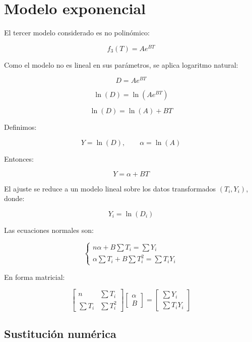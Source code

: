 \documentclass[12pt,a4paper]{article}
\newcommand{\modeloExponencial}{f_3(T)=Ae^{BT}}
\begin{document}
\section{Modelo exponencial}

El tercer modelo considerado es no polinómico:

\[
    \modeloExponencial
\]

Como el modelo no es lineal en sus parámetros, se aplica logaritmo natural:

\[
    D = Ae^{BT}
\]

\[
    \ln(D)=\ln(Ae^{BT})
\]

\[
    \ln(D)=\ln(A)+BT
\]

Definimos:

\[
    Y = \ln(D),
    \qquad
    \alpha = \ln(A)
\]

Entonces:

\[
    Y = \alpha + BT
\]

El ajuste se reduce a un modelo lineal sobre los datos transformados \((T_i,Y_i)\), donde:

\[
    Y_i = \ln(D_i)
\]

Las ecuaciones normales son:

\[
\begin{cases}
n\alpha + B\sum T_i = \sum Y_i \\
\alpha\sum T_i + B\sum T_i^2 = \sum T_iY_i
\end{cases}
\]

En forma matricial:

\[
\begin{bmatrix}
n & \sum T_i \\
\sum T_i & \sum T_i^2
\end{bmatrix}
\begin{bmatrix}
\alpha \\
B
\end{bmatrix}
=
\begin{bmatrix}
\sum Y_i \\
\sum T_iY_i
\end{bmatrix}
\]

\subsection{Sustitución numérica}

\begin{table}[H]
\centering
\caption{Sumas utilizadas en el ajuste exponencial}

\end{table}
\end{document}
